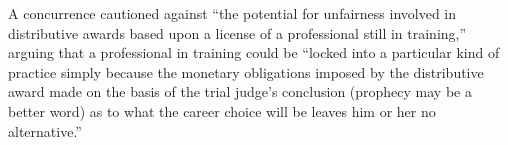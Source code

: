 A concurrence cautioned against ``the potential for unfairness involved in
distributive awards based upon a license of a professional still in training,''
arguing that a professional in training could be ``locked into a particular
kind of practice simply because the monetary obligations imposed by the
distributive award made on the basis of the trial judge's conclusion (prophecy
may be a better word) as to what the career choice will be leaves him or her no
alternative.''

